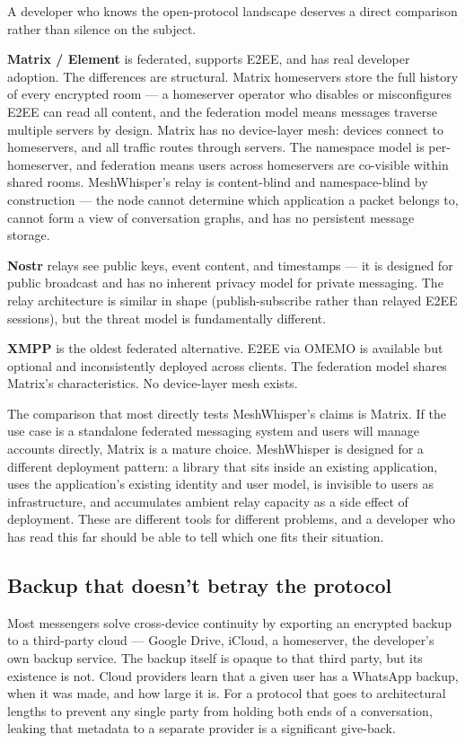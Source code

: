 \documentclass[11pt, a4paper]{article}
\begin{document}
A developer who knows the open-protocol landscape deserves a direct comparison rather than silence on the subject.

\textbf{Matrix / Element} is federated, supports E2EE, and has real developer adoption. The differences are structural. Matrix homeservers store the full history of every encrypted room — a homeserver operator who disables or misconfigures E2EE can read all content, and the federation model means messages traverse multiple servers by design. Matrix has no device-layer mesh: devices connect to homeservers, and all traffic routes through servers. The namespace model is per-homeserver, and federation means users across homeservers are co-visible within shared rooms. MeshWhisper's relay is content-blind and namespace-blind by construction — the node cannot determine which application a packet belongs to, cannot form a view of conversation graphs, and has no persistent message storage.

\textbf{Nostr} relays see public keys, event content, and timestamps — it is designed for public broadcast and has no inherent privacy model for private messaging. The relay architecture is similar in shape (publish-subscribe rather than relayed E2EE sessions), but the threat model is fundamentally different.

\textbf{XMPP} is the oldest federated alternative. E2EE via OMEMO is available but optional and inconsistently deployed across clients. The federation model shares Matrix's characteristics. No device-layer mesh exists.

The comparison that most directly tests MeshWhisper's claims is Matrix. If the use case is a standalone federated messaging system and users will manage accounts directly, Matrix is a mature choice. MeshWhisper is designed for a different deployment pattern: a library that sits inside an existing application, uses the application's existing identity and user model, is invisible to users as infrastructure, and accumulates ambient relay capacity as a side effect of deployment. These are different tools for different problems, and a developer who has read this far should be able to tell which one fits their situation.

\subsection*{Backup that doesn't betray the protocol}

Most messengers solve cross-device continuity by exporting an encrypted backup to a third-party cloud — Google Drive, iCloud, a homeserver, the developer's own backup service. The backup itself is opaque to that third party, but its existence is not. Cloud providers learn that a given user has a WhatsApp backup, when it was made, and how large it is. For a protocol that goes to architectural lengths to prevent any single party from holding both ends of a conversation, leaking that metadata to a separate provider is a significant give-back.
\end{document}
